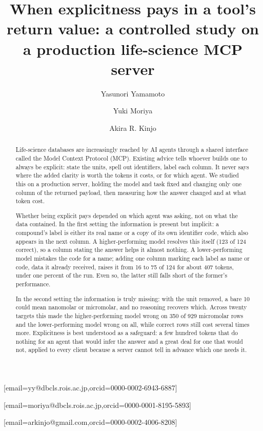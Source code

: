 \documentclass[sigconf]{ceurart}
\begin{document}


\title{When explicitness pays in a tool's return value:
a controlled study on a production life-science MCP server}

\author[1]{Yasunori Yamamoto}[email=yy@dbcls.rois.ac.jp,orcid=0000-0002-6943-6887]
\author[1]{Yuki Moriya}[email=moriya@dbcls.rois.ac.jp,orcid=0000-0001-8195-5893]
\address[1]{Database Division for Life Science (DBCLS), National Institute of Genetics, 178-4-4 Wakashiba, Kashiwa, Chiba 277-0871, JAPAN}
\author[2]{Akira R. Kinjo}[email=arkinjo@gmail.com,orcid=0000-0002-4006-8208]
\address[2]{Anima Machina G.K., Osaka Station Building No. 3, 29th floor, Room 1-1-1, 1-1-3 Umeda, Kita-ku, Osaka 530-0001, Japan}

\begin{abstract}
Life-science databases are increasingly reached by AI agents through a shared
interface called the Model Context Protocol (MCP). Existing advice tells whoever
builds one to always be explicit: state the units, spell out identifiers, label
each column. It never says where the added clarity is worth the tokens it costs,
or for which agent. We studied this on a production server, holding the model and
task fixed and changing only one column of the returned payload, then measuring
how the answer changed and at what token cost.

Whether being explicit pays depended on which agent was asking, not on what the
data contained. In the first setting the information is present but implicit: a
compound's label is either its real name or a copy of its own identifier code,
which also appears in the next column. A higher-performing model resolves this
itself (123 of 124 correct), so a column stating the answer helps it almost
nothing. A lower-performing model mistakes the code for a name; adding one column
marking each label as name or code, data it already received, raises it from 16 to
75 of 124 for about 407 tokens, under one percent of the run.
Even so, the latter still falls short of the former's performance.

In the second setting the information is truly missing: with the unit removed, a
bare 10 could mean nanomolar or micromolar, and no reasoning recovers which. Across
twenty targets this made the higher-performing model wrong on 350 of 929
micromolar rows and the lower-performing model wrong on all, while correct rows
still cost several times more. Explicitness is best understood as a safeguard: a few
hundred tokens that do nothing for an agent that would infer the answer and a great
deal for one that would not, applied to every client because a server cannot tell in
advance which one needs it.
\end{abstract}
\end{document}
